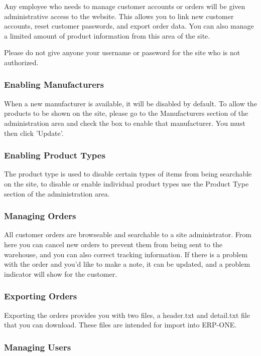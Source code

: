 Any employee who needs to manage customer accounts or orders will be given administrative access to the website. This allows you to link new customer accounts, reset customer passwords, and export order data.  You can also manage a limited amount of product information from this area of the site.

Please do not give anyone your username or password for the site who is not authorized.

\subsubsection{Enabling Manufacturers}

When a new manufacturer is available, it will be disabled by default.  To allow the products to be shown on the site, please go to the Manufacturers section of the administration area and check the box to enable that manufacturer.  You must then click 'Update'.

\subsubsection{Enabling Product Types}

The product type is used to disable certain types of items from being searchable on the site, to disable or enable individual product types use the Product Type section of the administration area.

\subsubsection{Managing Orders}

All customer orders are browseable and searchable to a site administrator. From here you can cancel new orders to prevent them from being sent to the warehouse, and you can also correct tracking information.  If there is a problem with the order and you'd like to make a note, it can be updated, and a problem indicator will show for the customer.

\subsubsection{Exporting Orders}

Exporting the orders provides you with two files, a header.txt and detail.txt file that you can download.  These files are intended for import into ERP-ONE.

\subsubsection{Managing Users}

